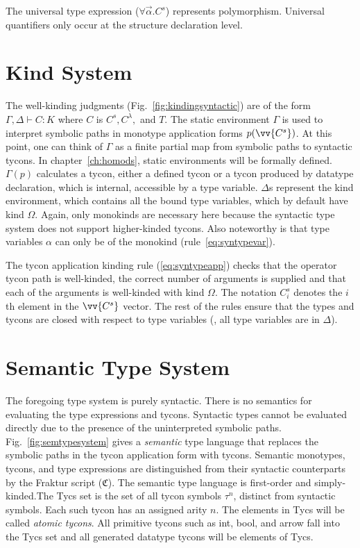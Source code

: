  The universal type expression ($\forall\vec{\alpha}.C^s$) represents polymorphism. Universal quantifiers only occur at the structure declaration level.

\section{Kind System}\label{sec:typesystem-kindsystem}
     

The well-kinding judgments (Fig.~\ref{fig:kindingsyntactic}) are of the form $\Gamma,\Delta\vdash C : K$
where $C$ is $C^s, C^\lambda,$ and $T$. The static environment
$\Gamma$ is used to interpret symbolic paths in monotype application
forms $p(\vv{C^s})$. At this point, one can think of $\Gamma$ as a
finite partial map from symbolic paths to syntactic tycons. In chapter~\ref{ch:homods}, static environments will be formally defined. $\Gamma(p)$ calculates a tycon, either a defined tycon or a tycon produced by datatype declaration, which is internal, accessible by a type variable. $\Delta$s represent the kind environment, which contains all the bound type variables, which by default have kind $\Omega$. Again, only monokinds are necessary here because the syntactic type system does not support higher-kinded tycons. Also noteworthy is that type variables $\alpha$ can only be of the monokind (rule~\ref{eq:syntypevar}). 

The tycon application kinding rule (\ref{eq:syntypeapp}) checks that the operator tycon path is well-kinded, the correct number of arguments is supplied and that each of the arguments is well-kinded with kind $\Omega$. The notation $C^s_i$ denotes the $i$th element in the $\vv{C^s}$ vector. The rest of the rules ensure that the types and tycons are closed with respect to type variables (\ie, all type variables are in $\Delta$). 

\section{Semantic Type System}\label{sec:semtypesys}



The foregoing type system is purely syntactic. There is no semantics for evaluating the type expressions and tycons. Syntactic types cannot be evaluated directly due to the presence of the uninterpreted symbolic paths. Fig.~\ref{fig:semtypesystem} gives a \emph{semantic} type language that replaces the symbolic paths in the tycon application form with tycons. Semantic monotypes, tycons, and type expressions are distinguished from their syntactic counterparts by the Fraktur script ($\mathfrak{C}$). The semantic type language is first-order and simply-kinded.The Tycs set is the set of all tycon symbols $\tau^n$, distinct from syntactic symbols. Each such tycon has an assigned arity $n$. The elements in Tycs will be called \emph{atomic tycons}.  All primitive tycons such as int, bool, and arrow fall into the Tycs set and all generated datatype tycons will be elements of Tycs. 


